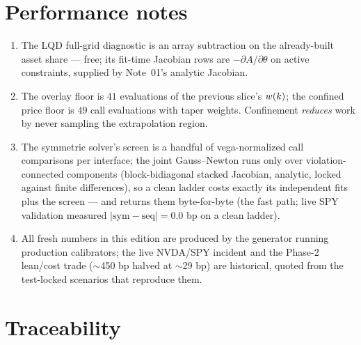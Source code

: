 \documentclass[11pt]{article}
\begin{document}
\section{Performance notes}
\label{app:perf}

\begin{enumerate}[leftmargin=1.6em]
\item The LQD full-grid diagnostic is an array subtraction on the
already-built asset share --- free; its fit-time Jacobian rows are
$-\partial A/\partial\theta$ on active constraints, supplied by
Note~01's analytic Jacobian.
\item The overlay floor is $41$ evaluations of the previous slice's
$w(k)$; the confined price floor is $49$ call evaluations with
taper weights.  Confinement \emph{reduces} work by never sampling the
extrapolation region.
\item The symmetric solver's screen is a handful of vega-normalized
call comparisons per interface; the joint Gauss--Newton runs only over
violation-connected components (block-bidiagonal stacked Jacobian,
analytic, locked against finite differences), so a clean ladder costs
exactly its independent fits plus the screen --- and returns them
byte-for-byte (the fast path; live SPY validation measured
$|\mathrm{sym}-\mathrm{seq}|=0.0$ bp on a clean ladder).
\item All fresh numbers in this edition are produced by the generator
running production calibrators; the live NVDA/SPY incident and the
Phase-2 lean/cost trade ($\sim$450 bp halved at $\sim$29 bp) are
historical, quoted from the test-locked scenarios that reproduce them.
\end{enumerate}

\section{Traceability}
\label{app:trace}
\end{document}
